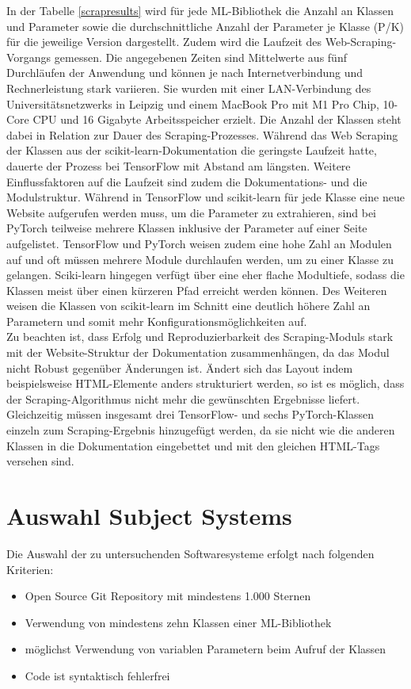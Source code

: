 \documentclass[german,bachelor]{swsLeipzig}
\begin{document}
In der Tabelle \ref{scrapresults} wird für jede ML-Bibliothek die Anzahl an Klassen und Parameter sowie die durchschnittliche
Anzahl der Parameter je Klasse (P/K) für die jeweilige Version dargestellt.
Zudem wird die Laufzeit des Web-Scraping-Vorgangs gemessen.
Die angegebenen Zeiten sind Mittelwerte aus fünf Durchläufen der Anwendung und können je nach Internetverbindung und Rechnerleistung
stark variieren.
Sie wurden mit einer LAN-Verbindung des Universitätsnetzwerks in Leipzig und
einem MacBook Pro mit M1 Pro Chip, 10-Core CPU und 16 Gigabyte Arbeitsspeicher erzielt.
Die Anzahl der Klassen steht dabei in Relation zur Dauer des Scraping-Prozesses.
Während das Web Scraping der Klassen aus der scikit-learn-Dokumentation die geringste Laufzeit hatte,
dauerte der Prozess bei TensorFlow mit Abstand am längsten.
Weitere Einflussfaktoren auf die Laufzeit sind zudem die Dokumentations- und die Modulstruktur.
Während in TensorFlow und scikit-learn für jede Klasse eine neue Website aufgerufen werden muss, um die Parameter zu extrahieren,
sind bei PyTorch teilweise mehrere Klassen inklusive der Parameter auf einer Seite aufgelistet.
TensorFlow und PyTorch weisen zudem eine hohe Zahl an Modulen auf und oft müssen mehrere Module durchlaufen werden, um zu einer Klasse zu gelangen.
Sciki-learn hingegen verfügt über eine eher flache Modultiefe, sodass die Klassen meist über einen kürzeren Pfad erreicht werden können.
Des Weiteren weisen die Klassen von scikit-learn im Schnitt eine deutlich höhere Zahl an Parametern und somit mehr Konfigurationsmöglichkeiten auf.\\
\indent Zu beachten ist, dass Erfolg und Reproduzierbarkeit des Scraping-Moduls stark mit der Website-Struktur der Dokumentation zusammenhängen,
da das Modul nicht Robust gegenüber Änderungen ist.
Ändert sich das Layout indem beispielsweise HTML-Elemente anders strukturiert werden, so ist es möglich,
dass der Scraping-Algorithmus nicht mehr die gewünschten Ergebnisse liefert.
Gleichzeitig müssen insgesamt drei TensorFlow- und sechs PyTorch-Klassen einzeln zum Scraping-Ergebnis hinzugefügt werden,
da sie nicht wie die anderen Klassen in die Dokumentation eingebettet und mit den gleichen HTML-Tags versehen sind.\\

\section{Auswahl Subject Systems}
Die Auswahl der zu untersuchenden Softwaresysteme erfolgt nach folgenden Kriterien:
\begin{itemize}
 \item Open Source Git Repository mit mindestens 1.000 Sternen
 \item Verwendung von mindestens zehn Klassen einer ML-Bibliothek
 \item möglichst Verwendung von variablen Parametern beim Aufruf der Klassen
 \item Code ist syntaktisch fehlerfrei
\end{itemize}
\end{document}
